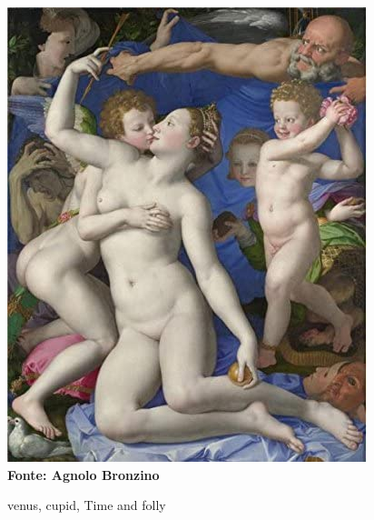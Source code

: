 			\begin{figure}[!ht]
				\setlength{\baselineskip}{\baselineskip} %
				\centering	
				\caption[\hspace{0.1cm} venus, cupid, Time and folly]{venus, cupid, Time and folly}
				\includegraphics[width=.5\textwidth, height=.3\textwidth]{midias/figura.jpg}
				\\
				\textbf{\footnotesize Fonte: Agnolo Bronzino}
				\label{figura1}
			\end{figure}
		
